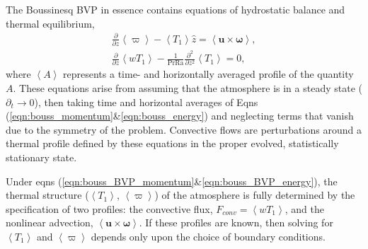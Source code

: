 \documentclass[aps, pre, onecolumn, nofootinbib, notitlepage, groupedaddress, amsfonts, amssymb, amsmath, longbibliography]{revtex4-1}
\newcommand{\angles}[1]{\ensuremath{\left\langle #1 \right\rangle}}
\begin{document}
The Boussinesq BVP in essence contains equations of hydrostatic balance and thermal equilibrium,
\begin{gather}
\frac{\partial}{\partial z}\angles{\varpi} - \angles{T_1}\hat{z} = \angles{\bm{u}\times\bm{\omega}},
	\label{eqn:bouss_BVP_momentum}
\\
\frac{\partial}{\partial z}\angles{wT_1} - \frac{1}{\text{Pr}\text{Ra}}\frac{\partial^2}{\partial z^2} \angles{T_1} = 0,
	\label{eqn:bouss_BVP_energy}
\end{gather}
where $\angles{A}$ represents a time- and horizontally averaged profile of the quantity $A$.  
These
equations arise from assuming that the atmosphere is in a steady state ($\partial_t \rightarrow 0$),
then taking time and horizontal averages of Eqns (\ref{eqn:bouss_momentum}\&\ref{eqn:bouss_energy}) and
neglecting terms that vanish due to the symmetry of the problem.
Convective flows
are perturbations around a thermal profile defined by these equations in the proper evolved, statistically stationary state.

Under eqns (\ref{eqn:bouss_BVP_momentum}\&\ref{eqn:bouss_BVP_energy}), 
the thermal structure ($\angles{T_1}$, $\angles{\varpi}$) of the atmosphere is fully determined by the specification
of two profiles: the convective flux, $F_{conv} = \angles{w T_1}$, and the nonlinear advection, $\angles{\bm{u}\times\bm{\omega}}$.  
If these profiles are known, then 
solving for $\angles{T_1}$ and
$\angles{\varpi}$ depends only upon the choice of boundary conditions.
\end{document}
